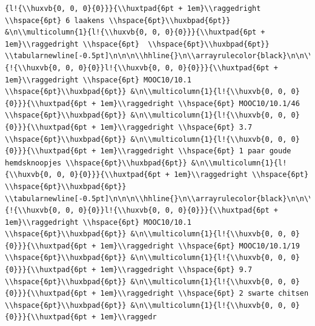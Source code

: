 \documentclass[11pt,preprint, authoryear]{elsarticle}
\numberwithin{equation}{section}
\numberwithin{figure}{section}
\numberwithin{table}{section}
\begin{document}
\begin{verbatim}
{l!{\\huxvb{0, 0, 0}{0}}}{\\huxtpad{6pt + 1em}\\raggedright \\hspace{6pt} 6 laakens \\hspace{6pt}\\huxbpad{6pt}} &\n\\multicolumn{1}{l!{\\huxvb{0, 0, 0}{0}}}{\\huxtpad{6pt + 1em}\\raggedright \\hspace{6pt}  \\hspace{6pt}\\huxbpad{6pt}} \\tabularnewline[-0.5pt]\n\n\n\\hhline{}\n\\arrayrulecolor{black}\n\n\\multicolumn{1}{!{\\huxvb{0, 0, 0}{0}}l!{\\huxvb{0, 0, 0}{0}}}{\\huxtpad{6pt + 1em}\\raggedright \\hspace{6pt} MOOC10/10.1 \\hspace{6pt}\\huxbpad{6pt}} &\n\\multicolumn{1}{l!{\\huxvb{0, 0, 0}{0}}}{\\huxtpad{6pt + 1em}\\raggedright \\hspace{6pt} MOOC10/10.1/46 \\hspace{6pt}\\huxbpad{6pt}} &\n\\multicolumn{1}{l!{\\huxvb{0, 0, 0}{0}}}{\\huxtpad{6pt + 1em}\\raggedright \\hspace{6pt} 3.7 \\hspace{6pt}\\huxbpad{6pt}} &\n\\multicolumn{1}{l!{\\huxvb{0, 0, 0}{0}}}{\\huxtpad{6pt + 1em}\\raggedright \\hspace{6pt} 1 paar goude hemdsknoopjes \\hspace{6pt}\\huxbpad{6pt}} &\n\\multicolumn{1}{l!{\\huxvb{0, 0, 0}{0}}}{\\huxtpad{6pt + 1em}\\raggedright \\hspace{6pt}  \\hspace{6pt}\\huxbpad{6pt}} \\tabularnewline[-0.5pt]\n\n\n\\hhline{}\n\\arrayrulecolor{black}\n\n\\multicolumn{1}{!{\\huxvb{0, 0, 0}{0}}l!{\\huxvb{0, 0, 0}{0}}}{\\huxtpad{6pt + 1em}\\raggedright \\hspace{6pt} MOOC10/10.1 \\hspace{6pt}\\huxbpad{6pt}} &\n\\multicolumn{1}{l!{\\huxvb{0, 0, 0}{0}}}{\\huxtpad{6pt + 1em}\\raggedright \\hspace{6pt} MOOC10/10.1/19 \\hspace{6pt}\\huxbpad{6pt}} &\n\\multicolumn{1}{l!{\\huxvb{0, 0, 0}{0}}}{\\huxtpad{6pt + 1em}\\raggedright \\hspace{6pt} 9.7 \\hspace{6pt}\\huxbpad{6pt}} &\n\\multicolumn{1}{l!{\\huxvb{0, 0, 0}{0}}}{\\huxtpad{6pt + 1em}\\raggedright \\hspace{6pt} 2 swarte chitsen \\hspace{6pt}\\huxbpad{6pt}} &\n\\multicolumn{1}{l!{\\huxvb{0, 0, 0}{0}}}{\\huxtpad{6pt + 1em}\\raggedr
\end{verbatim}
\end{document}
